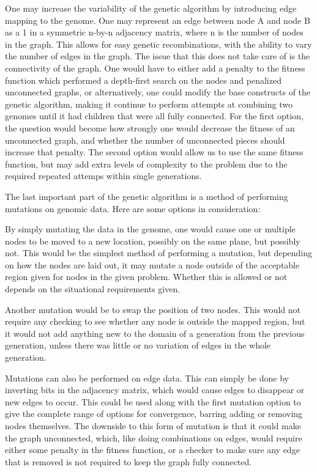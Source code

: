 \documentclass[10pt]{article}
\begin{document}
One may increase the variability of the genetic algorithm by introducing edge mapping to the genome.  One may represent an edge between node A and node B as a 1 in a symmetric n-by-n adjacency matrix, where n is the number of nodes in the graph.  This allows for easy genetic recombinations, with the ability to vary the number of edges in the graph.  The issue that this does not take care of is the connectivity of the graph.  One would have to either add a penalty to the fitness function which performed a depth-first search on the nodes and penalized unconnected graphs, or alternatively, one could modify the base constructs of the genetic algorithm, making it continue to perform attempts at combining two genomes until it had children that were all fully connected.  For the first option, the question would become how strongly one would decrease the fitness of an unconnected graph, and whether the number of unconnected pieces should increase that penalty.  The second option would allow us to use the same fitness function, but may add extra levels of complexity to the problem due to the required repeated attemps within single generations.

The last important part of the genetic algorithm is a method of performing mutations on genomic data.  Here are some options in consideration:

By simply mutating the data in the genome, one would cause one or multiple nodes to be moved to a new location, possibly on the same plane, but possibly not.  This would be the simplest method of performing a mutation, but depending on how the nodes are laid out, it may mutate a node outside of the acceptable region given for nodes in the given problem.  Whether this is allowed or not depends on the situational requirements given.

Another mutation would be to swap the position of two nodes.  This would not require any checking to see whether any node is outside the mapped region, but it would not add anything new to the domain of a generation from the previous generation, unless there was little or no variation of edges in the whole generation.

Mutations can also be performed on edge data.  This can simply be done by inverting bits in the adjacency matrix, which would cause edges to disappear or new edges to occur.  This could be used along with the first mutation option to give the complete range of options for convergence, barring adding or removing nodes themselves.  The downside to this form of mutation is that it could make the graph unconnected, which, like doing combinations on edges, would require either some penalty in the fitness function, or a checker to make sure any edge that is removed is not required to keep the graph fully connected.
\end{document}
